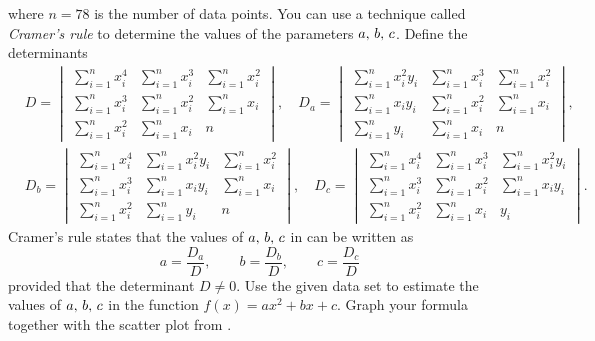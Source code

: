 \documentclass[a4paper,oneside,12pt]{article}
\begin{document}
\begin{problem}
\begin{packedenum}
\begin{equation}
    \end{equation}
    where $n = 78$ is the number of data points.  You can use a
    technique called \emph{Cramer's rule} to determine the values of
    the parameters ${a},\, {b},\, {c}$.  Define the determinants
    \begin{align*}
    &D
    =
    \begin{vmatrix}
    \sum_{i=1}^n x_i^4 & \sum_{i=1}^n x_i^3 & \sum_{i=1}^n x_i^2 \\[4pt]
    \sum_{i=1}^n x_i^3 & \sum_{i=1}^n x_i^2 & \sum_{i=1}^n x_i   \\[4pt]
    \sum_{i=1}^n x_i^2 & \sum_{i=1}^n x_i   & n
    \end{vmatrix},
    \quad
    D_a
    =
    \begin{vmatrix}
    \sum_{i=1}^n x_i^2y_i & \sum_{i=1}^n x_i^3 & \sum_{i=1}^n x_i^2 \\[4pt]
    \sum_{i=1}^n x_iy_i   & \sum_{i=1}^n x_i^2 & \sum_{i=1}^n x_i   \\[4pt]
    \sum_{i=1}^n y_i      & \sum_{i=1}^n x_i   & n
    \end{vmatrix}, \\[4pt]
    &D_b
    =
    \begin{vmatrix}
    \sum_{i=1}^n x_i^4 & \sum_{i=1}^n x_i^2y_i & \sum_{i=1}^n x_i^2 \\[4pt]
    \sum_{i=1}^n x_i^3 & \sum_{i=1}^n x_iy_i   & \sum_{i=1}^n x_i   \\[4pt]
    \sum_{i=1}^n x_i^2 & \sum_{i=1}^n y_i      & n
    \end{vmatrix},
    \quad
    D_c
    =
    \begin{vmatrix}
    \sum_{i=1}^n x_i^4 & \sum_{i=1}^n x_i^3 & \sum_{i=1}^n x_i^2y_i \\[4pt]
    \sum_{i=1}^n x_i^3 & \sum_{i=1}^n x_i^2 & \sum_{i=1}^n x_iy_i   \\[4pt]
    \sum_{i=1}^n x_i^2 & \sum_{i=1}^n x_i   & y_i
    \end{vmatrix}.
    \end{align*}
    Cramer's rule states that the values of ${a},\, {b},\, {c}$ in
     can
    be written as
    \[
    a
    =
    \frac{D_a}{D},
    \qquad
    b
    =
    \frac{D_b}{D},
    \qquad
    c
    =
    \frac{D_c}{D}
    \]
    provided that the determinant $D \neq 0$.  Use the given data set
    to estimate the values of ${a},\, {b},\, {c}$ in the function
    $f(x) = ax^2 + bx + c$.  Graph your formula together with the
    scatter plot
    from .


\end{packedenum}
\end{problem}
\end{document}
